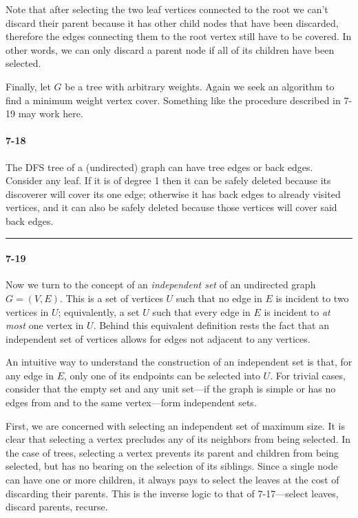 \documentclass{report}
\newcommand{\underconstruction}{\marginpar{\bcpanchant}}
\newcommand{\okthen}{\rule[-1.4pt]{0.3em}{0.77em}}
\begin{document}
Note that after selecting the two leaf vertices connected to the root we can't discard their parent because it has other child nodes that have been discarded, therefore the edges connecting them to the root vertex still have to be covered. In other words, we can only discard a parent node if all of its children have been selected.

\smallskip

Finally, let $G$ be a tree with arbitrary weights. Again we seek an algorithm to find a minimum weight vertex cover. Something like the procedure described in 7-19 may work here.\underconstruction

\paragraph{7-18} The DFS tree of a (undirected) graph can have tree edges or back edges. Consider any leaf. If it is of degree 1 then it can be safely deleted because its discoverer will cover its one edge; otherwise it has back edges to already visited vertices, and it can also be safely deleted because those vertices will cover said back edges.\ \okthen

\paragraph{7-19} Now we turn to the concept of an \emph{independent set} of an undirected graph $G = (V,E)$. This is a set of vertices $U$ such that no edge in $E$ is incident to two vertices in $U$; equivalently, a set $U$ such that every edge in $E$ is incident to \emph{at most} one vertex in $U$. Behind this equivalent definition rests the fact that an independent set of vertices allows for edges not adjacent to any vertices.

An intuitive way to understand the construction of an independent set is that, for any edge in $E$, only one of its endpoints can be selected into $U$. For trivial cases, consider that the empty set and any unit set---if the graph is simple or has no edges from and to the same vertex---form independent sets.

First, we are concerned with selecting an independent set of maximum size. It is clear that selecting a vertex precludes any of its neighbors from being selected. In the case of trees, selecting a vertex prevents its parent and children from being selected, but has no bearing on the selection of its siblings. Since a single node can have one or more children, it always pays to select the leaves at the cost of discarding their parents. This is the inverse logic to that of 7-17---select leaves, discard parents, recurse.
\end{document}
